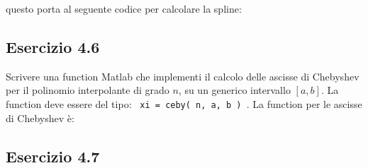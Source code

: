 questo porta al seguente codice per calcolare la spline:



	\subsection {Esercizio 4.6}
	
Scrivere una function Matlab che implementi il calcolo delle ascisse di Chebyshev per il polinomio interpolante di grado $n$, su un generico intervallo $[a,b]$. La function deve essere del tipo: \texttt { xi = ceby( n, a, b ) }.
\PP
La function per le ascisse di Chebyshev è:




	\subsection {Esercizio 4.7}
	
